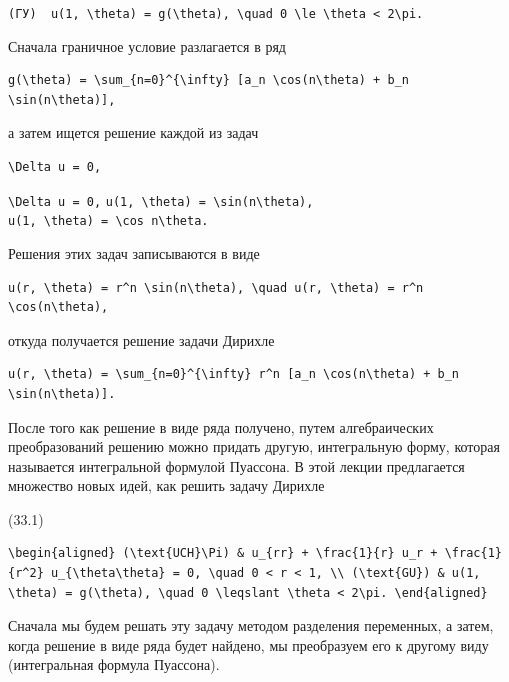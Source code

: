 \documentclass[
  ukrainian,
]{article}
\begin{document}
\texttt{(ГУ)\ \ \textquotesingle{}u(1,\ \textbackslash{}theta)\ =\ g(\textbackslash{}theta),\ \textbackslash{}quad\ 0\ \textbackslash{}le\ \textbackslash{}theta\ \textless{}\ 2\textbackslash{}pi.\textquotesingle{}}

Сначала граничное условие разлагается в ряд

\begin{verbatim}
g(\theta) = \sum_{n=0}^{\infty} [a_n \cos(n\theta) + b_n \sin(n\theta)],
\end{verbatim}

а затем ищется решение каждой из задач

\begin{verbatim}
\Delta u = 0,
\end{verbatim}

\texttt{\textbackslash{}Delta\ u\ =\ 0,}
\texttt{u(1,\ \textbackslash{}theta)\ =\ \textbackslash{}sin(n\textbackslash{}theta),}
\texttt{u(1,\ \textbackslash{}theta)\ =\ \textbackslash{}cos\ n\textbackslash{}theta.}

Решения этих задач записываются в виде

\begin{verbatim}
u(r, \theta) = r^n \sin(n\theta), \quad u(r, \theta) = r^n \cos(n\theta),
\end{verbatim}

откуда получается решение задачи Дирихле

\begin{verbatim}
u(r, \theta) = \sum_{n=0}^{\infty} r^n [a_n \cos(n\theta) + b_n \sin(n\theta)].
\end{verbatim}

После того как решение в виде ряда получено, путем алгебраических
преобразований решению можно придать другую, интегральную форму, которая
называется интегральной формулой Пуассона. В этой лекции предлагается
множество новых идей, как решить задачу Дирихле

(33.1)

\begin{verbatim}
\begin{aligned} (\text{UCH}\Pi) & u_{rr} + \frac{1}{r} u_r + \frac{1}{r^2} u_{\theta\theta} = 0, \quad 0 < r < 1, \\ (\text{GU}) & u(1, \theta) = g(\theta), \quad 0 \leqslant \theta < 2\pi. \end{aligned}
\end{verbatim}

Сначала мы будем решать эту задачу методом разделения переменных, а
затем, когда решение в виде ряда будет найдено, мы преобразуем его к
другому виду (интегральная формула Пуассона).
\end{document}
